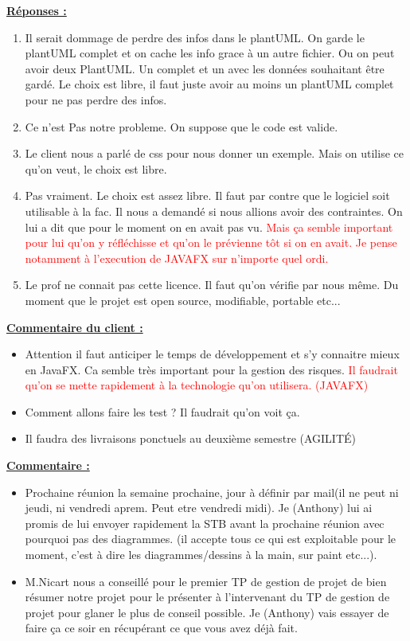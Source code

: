 \documentclass[a4paper,10pt]{article}
\begin{document}
\textbf{\underline{Réponses :}} 
\begin{enumerate}
 \item Il serait dommage de perdre des infos dans le plantUML. On garde le plantUML complet et on cache les info grace à un autre fichier. 
	Ou on peut avoir deux PlantUML. Un complet et un avec les données souhaitant être gardé. Le choix est libre, il faut juste avoir au moins
	un plantUML complet pour ne pas perdre des infos.
 \item Ce n'est Pas notre probleme. On suppose que le code est valide.
 \item Le client nous a parlé de css pour nous donner un exemple. Mais on utilise ce qu'on veut, le choix est libre.
 \item Pas vraiment. Le choix est assez libre. Il faut par contre que le logiciel soit utilisable à la fac. Il nous a demandé si
	nous allions avoir des contraintes. On lui a dit que pour le moment on en avait pas vu. \textcolor{red}{Mais ça semble important pour lui 
	qu'on y réfléchisse et qu'on le prévienne tôt si on en avait. Je pense notamment à l'execution de JAVAFX sur n'importe quel ordi.}
 \item Le prof ne connait pas cette licence. Il faut qu'on vérifie par nous même. Du moment que le projet est open source, modifiable, portable etc...
\end{enumerate}

\textbf{\underline{Commentaire du client :}}
\begin{itemize}
  \item Attention il faut anticiper le temps de développement et s'y connaitre mieux en JavaFX. Ca semble très important pour la gestion des risques. 
	\textcolor{red}{Il faudrait qu'on se mette rapidement à la technologie qu'on utilisera. (JAVAFX)}
  \item Comment allons faire les test ? Il faudrait qu'on voit ça.
  \item Il faudra des livraisons ponctuels au deuxième semestre (AGILITÉ)
\end{itemize}

\textbf{\underline{Commentaire :}}
\begin{itemize}
  \item Prochaine réunion la semaine prochaine, jour à définir par mail(il ne peut ni jeudi, ni vendredi aprem. Peut etre vendredi midi). 
	Je (Anthony) lui ai promis de lui envoyer rapidement la STB avant la prochaine réunion avec pourquoi pas des diagrammes. 
	(il accepte tous ce qui est exploitable pour le moment, c'est à dire les diagrammes/dessins à la main, sur paint etc...).
  \item M.Nicart nous a conseillé pour le premier TP de gestion de projet de bien résumer notre projet pour le présenter à l'intervenant 
	du TP de gestion de projet pour glaner le plus de conseil possible. Je (Anthony) vais essayer de faire ça ce soir en récupérant ce que vous avez déjà fait.
\end{itemize}
\end{document}
